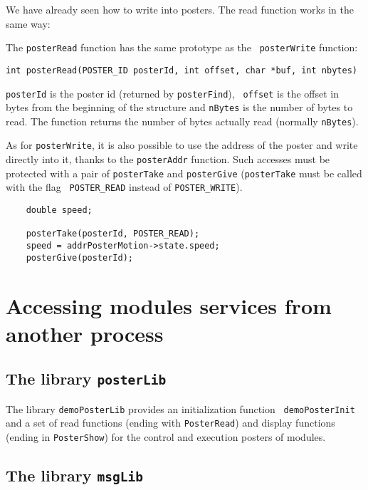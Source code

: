 We have  already seen how to write  into posters. The read function works
in the same way:

The   {\tt  posterRead} function   has the  same    prototype as the {\tt
posterWrite} function:

\bigbreak
{\tt int posterRead(POSTER\_ID posterId, int offset, char *buf, int nbytes)}
\bigbreak

{\tt  posterId} is  the poster id   (returned by {\tt posterFind}),  {\tt
offset} is the offset  in bytes from  the beginning of the structure  and
{\tt  nBytes} is the number  of bytes to read.   The function returns the
number of bytes actually read (normally {\tt nBytes}).

As for {\tt posterWrite},  it is also possible to  use the address of the
poster and   write  directly into  it,  thanks  to  the {\tt  posterAddr}
function. Such accesses must be protected with a pair of {\tt posterTake}
and {\tt posterGive} ({\tt posterTake} must be  called with the flag {\tt
POSTER\_READ} instead of {\tt POSTER\_WRITE}).

\begin{center}\begin{cartouche}\small\begin{verbatim}
    double speed;

    posterTake(posterId, POSTER_READ);
    speed = addrPosterMotion->state.speed;
    posterGive(posterId);
\end{verbatim}\end{cartouche}\end{center}



\section{Accessing modules services from another process}

\subsection{The library {\tt posterLib}}

The library {\tt  demoPosterLib} provides an initialization function {\tt
demoPosterInit} and a set of  read functions (ending with {\tt PosterRead})
and display  functions (ending in {\tt  PosterShow}) for the  control and
execution posters of modules.

\subsection{The library {\tt msgLib}}

